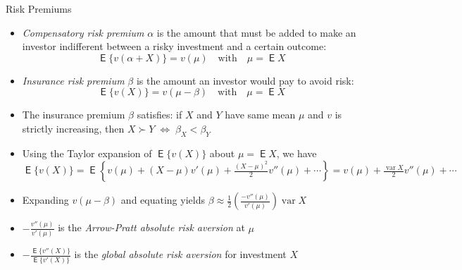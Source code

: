 \documentclass[10pt,handout]{beamer}
\newcommand{\ds}{\displaystyle}
\newcommand{\ifff}{\;\Longleftrightarrow\;}
\DeclareMathOperator\expc{\mathsf{E}}
\DeclareMathOperator\var{var}
\theoremstyle{definition}
\begin{document}
\begin{frame}{Risk Premiums}
  \begin{itemize}[<+->]
    \item \emph{Compensatory risk premium} $\alpha$ is the amount that must be added to make an investor indifferent between a risky investment and a certain outcome:
      \[\expc\{v(\alpha + X)\} = v(\mu) \quad \text{with} \quad \mu = \expc X\]
    \item \emph{Insurance risk premium} $\beta$ is the amount an investor would pay to avoid risk:
      \[\expc\{v(X)\} = v(\mu - \beta) \quad \text{with} \quad \mu = \expc X\]
    \item The insurance premium $\beta$ satisfies: if $X$ and $Y$ have same mean $\mu$ and $v$ is strictly increasing, then $\ds X \succ Y \ifff \beta_X < \beta_Y$
    \item Using the Taylor expansion of $\expc\{v(X)\}$ about $\mu = \expc X$, we have $\ds\expc\{v(X)\} = \expc\left\{v(\mu) + (X - \mu)v'(\mu) + \frac{(X - \mu)^2}{2}v''(\mu) + \cdots\right\} = v(\mu) + \frac{\var X}{2}v''(\mu) + \cdots$
    \item Expanding $v(\mu - \beta)$ and equating yields $\ds\beta \approx \frac{1}{2}\left(\frac{-v''(\mu)}{v'(\mu)}\right)\var X$
    \item $\ds -\frac{v''(\mu)}{v'(\mu)}$ is the \emph{Arrow-Pratt absolute risk aversion} at $\mu$
    \item $\ds -\frac{\expc\{v''(X)\}}{\expc\{v'(X)\}}$ is the \emph{global absolute risk aversion} for investment $X$
  \end{itemize}
\end{frame}
\end{document}
